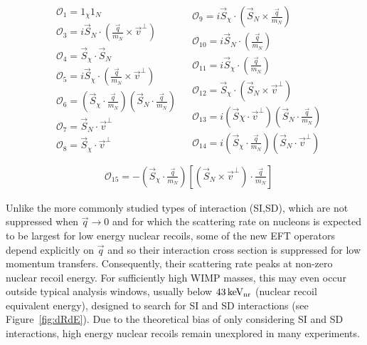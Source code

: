 \begingroup
\belowdisplayskip=0pt
\begin{align*}
\begin{split} 
&\mathcal{O}_1 = 1_{\chi} 1_N  \\
&\mathcal{O}_3 = i\vec{S}_N\cdot (\frac{\vec{q}}{m_N}\times\vec{v}^\perp) \\
&\mathcal{O}_4 = \vec{S}_{\chi}\cdot \vec{S}_N \\
&\mathcal{O}_5 = i\vec{S}_{\chi}\cdot (\frac{\vec{q}}{m_N}\times\vec{v}^\perp) \\
&\mathcal{O}_6 = (\vec{S}_{\chi} \cdot \frac{\vec{q}}{m_N})(\vec{S}_N \cdot \frac{\vec{q}}{m_N}) \\
&\mathcal{O}_7 = \vec{S}_N \cdot \vec{v}^\perp \\
&\mathcal{O}_8 = \vec{S}_{\chi} \cdot \vec{v}^\perp  \\
\end{split}
\begin{split}
&\mathcal{O}_9 = i\vec{S}_{\chi} \cdot(\vec{S}_N \times \frac{\vec{q}}{m_N}) \\
&\mathcal{O}_{10} = i\vec{S}_N \cdot (\frac{\vec{q}}{m_N}) \\
&\mathcal{O}_{11} = i\vec{S}_{\chi} \cdot (\frac{\vec{q}}{m_N}) \\
&\mathcal{O}_{12} = \vec{S}_\chi \cdot (\vec{S}_N \times \vec{v}^\perp) \\
&\mathcal{O}_{13} = i(\vec{S}\chi \cdot \vec{v}^\perp)(\vec{S}_N \cdot \frac{\vec{q}}{m_N})\\
&\mathcal{O}_{14} = i(\vec{S}_\chi \cdot \frac{\vec{q}}{m_N})(\vec{S}_N \cdot \vec{v}^\perp) \\
\end{split}
\end{align*}
\endgroup
\begingroup
\abovedisplayskip=0pt
\begin{align}
&\mathcal{O}_{15} = -(\vec{S}_\chi \cdot \frac{\vec{q}}{m_N})\left[(\vec{S}_N \times \vec{v}^\perp)\cdot \frac{\vec{q}}{m_N}\right]
\label{eq:OpDef}
\end{align}
\endgroup

Unlike the more commonly studied types of interaction (SI,SD), which are not suppressed when $\vec{q} \rightarrow 0$ and for which the scattering rate on nucleons is expected to be largest for low energy nuclear recoils, some of the new EFT operators depend explicitly on $\vec{q}$ and so their interaction cross section is suppressed for low momentum transfers. Consequently, their scattering rate peaks at non-zero nuclear recoil energy. For sufficiently high WIMP masses, this may even occur outside typical analysis windows, usually below $ 43\,\mathrm{keV_\mathrm{nr}}$ (nuclear recoil equivalent
energy), designed to search for SI and SD interactions (see Figure~\ref{fig:dRdE}). Due to the theoretical bias of only considering SI and SD interactions, high energy nuclear recoils remain unexplored in many experiments.
	    

